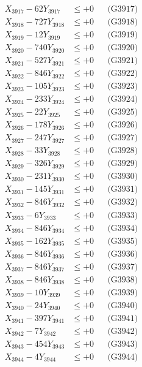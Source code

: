 \documentclass[a4paper,10pt]{article}
\begin{document}
{\begin{align}
X_{3917} - 62Y_{3917} &\leq +0 && \text{(G3917)} \\
X_{3918} - 727Y_{3918} &\leq +0 && \text{(G3918)} \\
X_{3919} - 12Y_{3919} &\leq +0 && \text{(G3919)} \\
X_{3920} - 740Y_{3920} &\leq +0 && \text{(G3920)} \\
\allowbreak
X_{3921} - 527Y_{3921} &\leq +0 && \text{(G3921)} \\
X_{3922} - 846Y_{3922} &\leq +0 && \text{(G3922)} \\
X_{3923} - 105Y_{3923} &\leq +0 && \text{(G3923)} \\
X_{3924} - 233Y_{3924} &\leq +0 && \text{(G3924)} \\
X_{3925} - 22Y_{3925} &\leq +0 && \text{(G3925)} \\
X_{3926} - 178Y_{3926} &\leq +0 && \text{(G3926)} \\
X_{3927} - 247Y_{3927} &\leq +0 && \text{(G3927)} \\
X_{3928} - 33Y_{3928} &\leq +0 && \text{(G3928)} \\
X_{3929} - 326Y_{3929} &\leq +0 && \text{(G3929)} \\
X_{3930} - 231Y_{3930} &\leq +0 && \text{(G3930)} \\
\allowbreak
X_{3931} - 145Y_{3931} &\leq +0 && \text{(G3931)} \\
X_{3932} - 846Y_{3932} &\leq +0 && \text{(G3932)} \\
X_{3933} - 6Y_{3933} &\leq +0 && \text{(G3933)} \\
X_{3934} - 846Y_{3934} &\leq +0 && \text{(G3934)} \\
X_{3935} - 162Y_{3935} &\leq +0 && \text{(G3935)} \\
X_{3936} - 846Y_{3936} &\leq +0 && \text{(G3936)} \\
X_{3937} - 846Y_{3937} &\leq +0 && \text{(G3937)} \\
X_{3938} - 846Y_{3938} &\leq +0 && \text{(G3938)} \\
X_{3939} - 10Y_{3939} &\leq +0 && \text{(G3939)} \\
X_{3940} - 24Y_{3940} &\leq +0 && \text{(G3940)} \\
\allowbreak
X_{3941} - 397Y_{3941} &\leq +0 && \text{(G3941)} \\
X_{3942} - 7Y_{3942} &\leq +0 && \text{(G3942)} \\
X_{3943} - 454Y_{3943} &\leq +0 && \text{(G3943)} \\
X_{3944} - 4Y_{3944} &\leq +0 && \text{(G3944)} \\

\end{align}}
\end{document}
